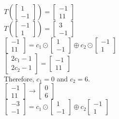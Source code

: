 		\begin{solution} \\
            $T\left( \begin{bmatrix}1 \\ -1 \end{bmatrix} \right) = \begin{bmatrix} -1 \\ 11 \end{bmatrix}$
            \\
            $T\left( \begin{bmatrix}-1 \\ 1 \end{bmatrix} \right) = \begin{bmatrix} 3 \\ -1 \end{bmatrix}$
            \\
            $\begin{bmatrix}-1\\11\end{bmatrix} = c_1\odot\begin{bmatrix}1\\-1\end{bmatrix}\oplus c_2\odot\begin{bmatrix}-1\\1\end{bmatrix}$
            \\
            $\begin{bmatrix}2c_1-1 \\ 2c_2-1\end{bmatrix} = \begin{bmatrix} -1 \\ 11 \end{bmatrix}$
            \\
            Therefore, 
            $c_1 = 0$ and $c_2=6$.
            \\
            $\begin{bmatrix} -1 \\ 11 \end{bmatrix}\to \begin{bmatrix} 0 \\ 6 \end{bmatrix}$
            \\
            $\begin{bmatrix} -3 \\ -1 \end{bmatrix}=c_1\odot\begin{bmatrix} 1 \\ -1 \end{bmatrix}\oplus c_2\begin{bmatrix} -1 \\ 1 \end{bmatrix}$

\end{solution}
